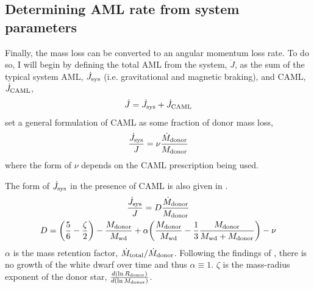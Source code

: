 

\subsection{Determining AML rate from system parameters}
\label{sect:modelling:getting AML rate from system parameters}

Finally, the mass loss can be converted to an angular momentum loss rate. To do so, I will begin by defining the total AML from the system, $\dot J$, as the sum of the typical system AML, $\dot J_{\rm sys}$ (i.e. gravitational and magnetic braking), and CAML, $\dot J_{\rm CAML}$,
\begin{equation}
    \dot J = \dot J_{\rm sys} + \dot J_{\rm CAML}
\end{equation}
\citet{king1995} set a general formulation of CAML as some fraction of donor mass loss,
\begin{equation}
    \frac{\dot J_{\rm sys}}{J} = \nu \frac{\dot M_{\rm donor}}{M_{\rm donor}}
\end{equation}
where the form of $\nu$ depends on the CAML prescription being used.

The form of $\dot J_{\rm sys}$ in the presence of CAML is also given in \citet{king1995}.
\begin{gather}
    \frac{\dot J_{\rm sys}}{J} = D \frac{\dot M_{\rm donor}}{M_{\rm donor}} \\
    D = \bigg(\frac{5}{6} - \frac{\zeta}{2}\bigg) - \frac{M_{\rm donor}}{M_{\rm wd}} + \alpha \bigg( \frac{M_{\rm donor}}{M_{\rm wd}} - \frac{1}{3} \frac{M_{\rm donor}}{M_{\rm wd} + M_{\rm donor}} \bigg)  - \nu
\end{gather}
$\alpha$ is the mass retention factor, $\dot M_{\rm total} / \dot M_{\rm donor}$. Following the findings of \citet{McAllister2019}, there is no growth of the white dwarf over time and thus $\alpha \equiv 1$. $\zeta$ is the mass-radius exponent of the donor star, $\frac{d(\ln R_{\rm donor})}{d(\ln M_{\rm donor})}$.

